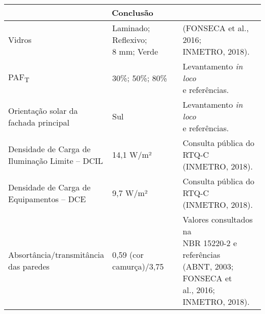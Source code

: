 \begin{table}[ht]\centering
    \begin{tabular*}{\columnwidth}{@{\extracolsep{\fill}}lll}
    \hline
    \multicolumn{3}{c}{Conclusão}\\\hline
    Vidros                                                         & \makecell[l]{Laminado; Reflexivo;\\ 8 mm; Verde}                                      & \makecell[l]{(FONSECA et al., 2016; \\INMETRO, 2018).}                                                                                                                   \\ \hline
    PAF\textsubscript{T}                                           & 30\%; 50\%; 80\%                                                                      & \makecell[l]{Levantamento \textit{in loco}\\ e referências.}                                                                                                             \\ \hline
    \makecell[l]{Orientação solar da \\fachada principal}          & Sul                                                                                   & \makecell[l]{Levantamento \textit{in loco}\\ e referências.}                                                                                                             \\ \hline
    \makecell[l]{Densidade de Carga de\\ Iluminação Limite – DCIL} & 14,1 W/m²                                                                             & \makecell[l]{Consulta pública do RTQ-C \\(INMETRO, 2018).}                                                                                                               \\ \hline
    \makecell[l]{Densidade de Carga de\\ Equipamentos – DCE}       & 9,7 W/m²                                                                              & \makecell[l]{Consulta pública do RTQ-C \\(INMETRO, 2018).}                                                                                                               \\ \hline
    \makecell[l]{Absortância/transmitância \\das paredes}          & \makecell[l]{0,59 (cor \\camurça)/3,75}                                               & \makecell[l]{Valores consultados na \\NBR 15220-2 e referências \\(ABNT, 2003; FONSECA et \\al., 2016; INMETRO, 2018).}                                                                     \\ \hline

\end{tabular*}
\end{table}
